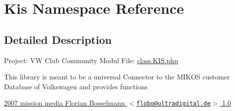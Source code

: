 \hypertarget{namespace_kis}{
\section{Kis Namespace Reference}
\label{namespace_kis}
}




\subsection{Detailed Description}
Project: VW Club Community Modul File: \hyperlink{class_8_k_i_s_8php-source}{class.KIS.php}

This library is meant to be a universal Connector to the MIKOS customer Database of Volkswagen and provides functions

\hyperlink{}{2007 mission media  Florian Bosselmann $<$\href{mailto:flobo@ultradigital.de}{\tt flobo@ultradigital.de}$>$   1.0 }